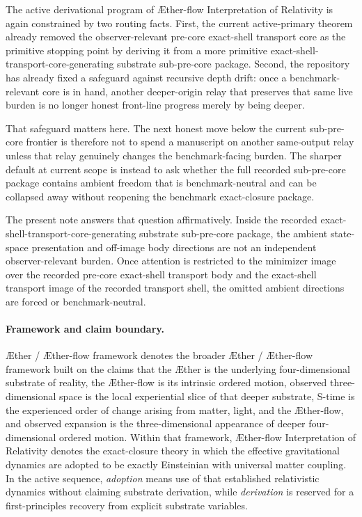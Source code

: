 \documentclass[11pt]{article}
\newcommand{\Aether}{\AE{}ther}
\newcommand{\Aflow}{\AE{}ther-flow}
\newcommand{\TheoryName}{\Aflow{} Interpretation of Relativity}
\newcommand{\TheoryProgram}{\Aether{} / \Aflow{} framework}
\begin{document}
The active derivational program of \TheoryName{} is again constrained by two routing facts. First, the current active-primary theorem already removed the observer-relevant pre-core exact-shell transport core as the primitive stopping point by deriving it from a more primitive exact-shell-transport-core-generating substrate sub-pre-core package. Second, the repository has already fixed a safeguard against recursive depth drift: once a benchmark-relevant core is in hand, another deeper-origin relay that preserves that same live burden is no longer honest front-line progress merely by being deeper.

That safeguard matters here. The next honest move below the current sub-pre-core frontier is therefore not to spend a manuscript on another same-output relay unless that relay genuinely changes the benchmark-facing burden. The sharper default at current scope is instead to ask whether the full recorded sub-pre-core package contains ambient freedom that is benchmark-neutral and can be collapsed away without reopening the benchmark exact-closure package.

The present note answers that question affirmatively. Inside the recorded exact-shell-transport-core-generating substrate sub-pre-core package, the ambient state-space presentation and off-image body directions are not an independent observer-relevant burden. Once attention is restricted to the minimizer image over the recorded pre-core exact-shell transport body and the exact-shell transport image of the recorded transport shell, the omitted ambient directions are forced or benchmark-neutral.

\paragraph{Framework and claim boundary.}
\TheoryProgram{} denotes the broader \Aether{} / \Aflow{} framework built on the claims that the \Aether{} is the underlying four-dimensional substrate of reality, the \Aflow{} is its intrinsic ordered motion, observed three-dimensional space is the local experiential slice of that deeper substrate, S-time is the experienced order of change arising from matter, light, and the \Aflow{}, and observed expansion is the three-dimensional appearance of deeper four-dimensional ordered motion. Within that framework, \TheoryName{} denotes the exact-closure theory in which the effective gravitational dynamics are adopted to be exactly Einsteinian with universal matter coupling. In the active sequence, \emph{adoption} means use of that established relativistic dynamics without claiming substrate derivation, while \emph{derivation} is reserved for a first-principles recovery from explicit substrate variables.
\end{document}
